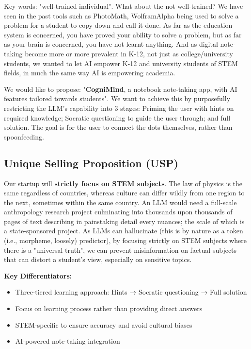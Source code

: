 Key words: "well-trained individual". What about the not well-trained? We have seen in the past tools such as PhotoMath,
WolframAlpha being used to solve a problem for a student to copy down and call it done. As far as the education system
is concerned, you have proved your ability to solve a problem, but as far as your brain is concerned, you have not
learnt anything. And as digital note-taking become more or more prevalent in K-12, not just as college/university
students, we wanted to let AI empower K-12 and university students of STEM fields, in much the same way AI is
empowering academia.

We would like to propose: "\textbf{CogniMind}, a notebook note-taking app, with AI features tailored towards students".
We want to achieve this by purposefully restricting the LLM's capability into 3 stages: Priming the user with hints on
required knowledge; Socratic questioning to guide the user through; and full solution. The goal is for the user to
connect the dots themselves, rather than spoonfeeding.

\subsection{Unique Selling Proposition (USP)}
Our startup will \textbf{strictly focus on STEM subjects}. The law of physics is the same regardless of countries,
whereas culture can differ wildly from one region to the next, sometimes within the same country. An LLM would need a
full-scale anthropology research project culminating into thousands upon thousands of pages of text describing in
painstaking detail every nuances; the scale of which is a state-sponsored project. As LLMs can hallucinate (this is by
nature as a token (i.e., morpheme, loosely) predictor), by focusing strictly on STEM subjects where there is a
"universal truth", we can prevent misinformation on factual subjects that can distort a student's view, especially on
sensitive topics.

\textbf{Key Differentiators:}
\begin{itemize}
    \item Three-tiered learning approach: Hints → Socratic questioning → Full solution
    \item Focus on learning process rather than providing direct answers
    \item STEM-specific to ensure accuracy and avoid cultural biases
    \item AI-powered note-taking integration
\end{itemize}

